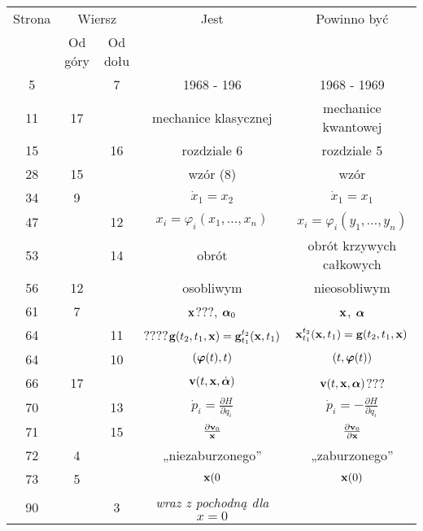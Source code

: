 \documentclass[a4paper,11pt]{article}
\numberwithin{equation}{section}
\begin{document}
\begin{center}

  \begin{tabular}{|c|c|c|c|c|}
    \hline
    Strona & \multicolumn{2}{c|}{Wiersz} & Jest
                              & Powinno być \\ \cline{2-3}
    & Od góry & Od dołu & & \\
    \hline
    5   & &  7 & 1968 - 196 & 1968 - 1969 \\
    11  & 17 & & mechanice klasycznej & mechanice kwantowej \\
    15  & & 16 & rozdziale 6 & rozdziale 5 \\
    28  & 15 & & wzór (8) & wzór \\
    34  &  9 & & $\dot{ x }_{ 1 } = x_{ 2 }$ & $\dot{ x }_{ 1 } = x_{ 1 }$ \\
    47  & & 12 & $x_{ i } = \varphi_{ i }( x_{ 1 }, \ldots, x_{ n } )$
           & $x_{ i } = \varphi_{ i }( y_{ 1 }, \ldots, y_{ n } )$ \\
    53  & & 14 & obrót & obrót krzywych całkowych \\
    56  & 12 & & osobliwym & nieosobliwym \\
    61  &  7 & & $\mathbf{x}$???, $\boldsymbol{\alpha}_{ 0 }$
           & $\mathbf{x}$, $\boldsymbol{\alpha}$ \\
    64  & & 11 & ????$\mathbf{g}( t_{ 2 }, t_{ 1 }, \mathbf{x} )
                = \mathbf{g}^{ t_{ 2 } }_{ t_{ 1 } }( \mathbf{x}, t_{ 1 } )$
           & $\mathbf{x}^{ t_{ 2 } }_{ t_{ 1 } }( \mathbf{x}, t_{ 1 } )
             = \mathbf{g}( t_{ 2 }, t_{ 1 }, \mathbf{x} )$ \\
    64  & & 10 & $( \boldsymbol{\varphi}( t ), t )$
           & $( t, \boldsymbol{\varphi}( t ) )$ \\[0.3em]
    66  & 17 & & $\mathbf{v}( t, \mathbf{x}, \dot{ \boldsymbol{\alpha} } )$
           & $\mathbf{v}( t, \mathbf{x}, \boldsymbol{\alpha} )$??? \\[0.3em]
    70  & & 13 & $\dot{ p }_{ i } = \frac{ \partial H }{ \partial q_{ i } }$
           & $\dot{ p }_{ i } = -\frac{ \partial H }{ \partial q_{ i } }$ \\[0.3em]
    71  & & 15 & $\frac{ \partial \mathbf{v}_{ 0 } }{ \mathbf{x} }$
           & $\frac{ \partial \mathbf{v}_{ 0 } }{ \partial \mathbf{x} }$ \\[0.4em]
    72  &  4 & & „niezaburzonego” & „zaburzonego” \\
    73  &  5 & & $\mathbf{x}( 0$ & $\mathbf{x}( 0 )$ \\
    90  & &  3 & \textit{wraz z pochodną dla} $x = 0$

\end{tabular}
\end{center}
\end{document}
